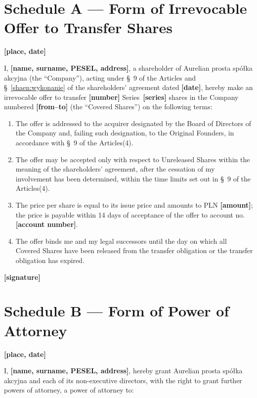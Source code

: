 \documentclass[12pt,a4paper]{report}
\newcommand{\field}[1]{\textbf{[#1]}}
\newcommand{\CompanyFull}{Aurelian prosta spółka akcyjna}
\newcommand{\USen}[1]{\S~#1 of the Articles}
\begin{document}
\newpage
\section*{Schedule A --- Form of Irrevocable Offer to Transfer Shares}

\field{place, date}

I, \field{name, surname, PESEL, address}, a shareholder of \CompanyFull{} (the ``Company''), acting under \USen{9} and \S~\ref{shaen:wykonanie} of the shareholders' agreement dated \field{date}, hereby make an irrevocable offer to transfer \field{number} Series~\field{series} shares in the Company numbered \field{from--to} (the ``Covered Shares'') on the following terms:

\begin{enumerate}
  \item The offer is addressed to the acquirer designated by the Board of Directors of the Company and, failing such designation, to the Original Founders, in accordance with \USen{9}(4).
  \item The offer may be accepted only with respect to Unreleased Shares within the meaning of the shareholders' agreement, after the cessation of my involvement has been determined, within the time limits set out in \USen{9}(4).
  \item The price per share is equal to its issue price and amounts to PLN \field{amount}; the price is payable within 14 days of acceptance of the offer to account no. \field{account number}.
  \item The offer binds me and my legal successors until the day on which all Covered Shares have been released from the transfer obligation or the transfer obligation has expired.
\end{enumerate}

\field{signature}

\newpage
\section*{Schedule B --- Form of Power of Attorney}

\field{place, date}

I, \field{name, surname, PESEL, address}, hereby grant \CompanyFull{} and each of its non-executive directors, with the right to grant further powers of attorney, a power of attorney to:
\end{document}
